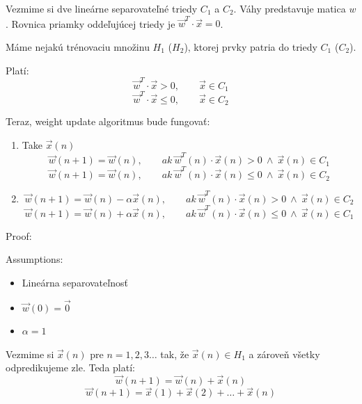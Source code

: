 \documentclass{article}
\numberwithin{equation}{section} %
\begin{document}
Vezmime si dve lineárne separovateľné triedy $C_1$ a $C_2$. Váhy predstavuje matica $w$. Rovnica priamky oddeľujúcej triedy je $\overrightarrow{w}^T\cdot \overrightarrow{x} = 0$.

Máme nejakú trénovaciu množinu $H_1$ ($H_2$), ktorej prvky patria do triedy $C_1$ ($C_2$).

Platí:
$$\overrightarrow{w}^T \cdot \overrightarrow{x} > 0, \qquad \overrightarrow{x} \in C_1$$
$$\overrightarrow{w}^T \cdot \overrightarrow{x} \leq 0, \qquad \overrightarrow{x} \in C_2$$

Teraz, weight update algoritmus bude fungovať:
\begin{enumerate}
\item Take $\overrightarrow{x}(n)$
$$\overrightarrow{w}(n+1) = \overrightarrow{w}(n),\qquad ak~ \overrightarrow{w}^T(n)\cdot\overrightarrow{x}(n) > 0 ~\land~ \overrightarrow{x}(n) \in C_1$$
$$\overrightarrow{w}(n+1) = \overrightarrow{w}(n),\qquad ak~ \overrightarrow{w}^T(n)\cdot\overrightarrow{x}(n) \leq 0 ~\land~ \overrightarrow{x}(n) \in C_2$$
\item 
$$\overrightarrow{w}(n+1) = \overrightarrow{w}(n) - \alpha\overrightarrow{x}(n),\qquad ak~ \overrightarrow{w}^T(n)\cdot\overrightarrow{x}(n) > 0 ~\land~ \overrightarrow{x}(n) \in C_2$$
$$\overrightarrow{w}(n+1) = \overrightarrow{w}(n) + \alpha\overrightarrow{x}(n),\qquad ak~ \overrightarrow{w}^T(n)\cdot\overrightarrow{x}(n) \leq 0 ~\land~ \overrightarrow{x}(n) \in C_1$$
\end{enumerate}

Proof: 

Assumptions:
\begin{itemize}
\item Lineárna separovateľnosť
\item $\overrightarrow{w}(0) = \overrightarrow{0}$
\item $\alpha = 1$
\end{itemize}

Vezmime si $\overrightarrow{x}(n)$ pre $n = 1,2,3 \ldots$ tak, že $\overrightarrow{x}(n) \in H_1$ a zároveň všetky odpredikujeme zle. Teda platí:
$$\overrightarrow{w}(n+1) = \overrightarrow{w}(n) + \overrightarrow{x}(n)$$
\begin{equation}\label{eq:1}
\overrightarrow{w}(n+1) = \overrightarrow{x}(1) + \overrightarrow{x}(2) + \ldots + \overrightarrow{x}(n)
\end{equation}
\end{document}
